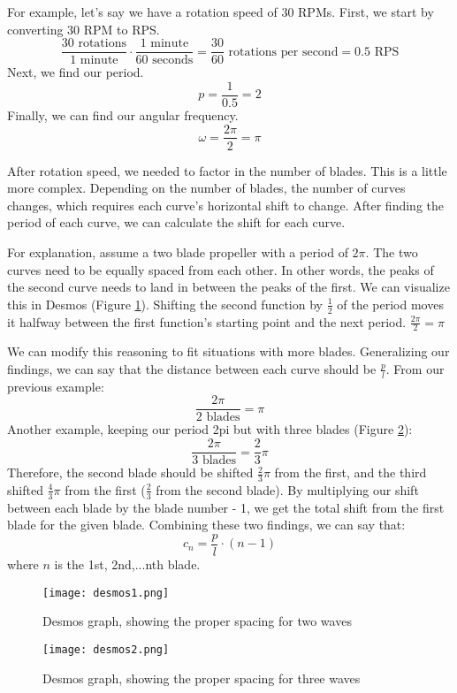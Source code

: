 For example, let's say we have a rotation speed of 30 RPMs. First, we start by converting 30 RPM to RPS.
\[\frac{30\mbox{ rotations}}{1\mbox{ minute}}\cdot\frac{1\mbox{ minute}}{60\mbox{ seconds}}=\frac{30}{60}\mbox{ rotations per second}=0.5\mbox{ RPS}\]
Next, we find our period.
\[p=\frac{1}{0.5}=2\]
Finally, we can find our angular frequency. 
\[\omega=\frac{2\pi}{2}=\pi\]

After rotation speed, we needed to factor in the number of blades. This is a little more complex. Depending on the number of blades, the number of curves changes, which requires each curve’s horizontal shift to change. After finding the period of each curve, we can calculate the shift for each curve. 

For explanation, assume a two blade propeller with a period of \(2\pi\). The two curves need to be equally spaced from each other. In other words, the peaks of the second curve needs to land in between the peaks of the first. We can visualize this in Desmos (Figure \ref{fig:desmos1}). Shifting the second function by \(\frac{1}{2}\) of the period moves it halfway between the first function’s starting point and the next period. \(\frac{2\pi}{2}=\pi\)

We can modify this reasoning to fit situations with more blades. Generalizing our findings, we can say that the distance between each curve should be \(\frac{p}{l}\). From our previous example:
\[\frac{2\pi}{2\mbox{ blades}}=\pi\]
Another example, keeping our period 2pi but with three blades (Figure \ref{fig:desmos2}):
\[\frac{2\pi}{3\mbox{ blades}}=\frac{2}{3}\pi\]
Therefore, the second blade should be shifted \(\frac{2}{3}\pi\) from the first, and the third shifted \(\frac{4}{3}\pi\) from the first (\(\frac{2}{3}\) from the second blade). By multiplying our shift between each blade by the blade number - 1, we get the total shift from the first blade for the given blade. Combining these two findings, we can say that:
\[c_n=\frac{p}{l}\cdot(n - 1)\]
where \(n\) is the 1st, 2nd,...nth blade.

\begin{figure}[ht]
\texttt{[image: desmos1.png]}
\caption{Desmos graph, showing the proper spacing for two waves}
\label{fig:desmos1}
\end{figure}

\begin{figure}[ht]
\texttt{[image: desmos2.png]}
\caption{Desmos graph, showing the proper spacing for three waves}
\label{fig:desmos2}
\end{figure}

